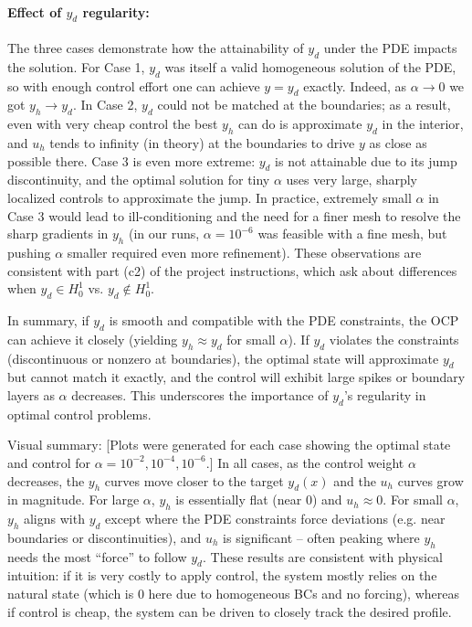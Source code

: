 \paragraph{Effect of $y_d$ regularity:} The three cases demonstrate how the attainability of $y_d$ under the PDE impacts the solution. For Case 1, $y_d$ was itself a valid homogeneous solution of the PDE, so with enough control effort one can achieve $y=y_d$ exactly. Indeed, as $\alpha\to 0$ we got $y_h\to y_d$. In Case 2, $y_d$ could not be matched at the boundaries; as a result, even with very cheap control the best $y_h$ can do is approximate $y_d$ in the interior, and $u_h$ tends to infinity (in theory) at the boundaries to drive $y$ as close as possible there. Case 3 is even more extreme: $y_d$ is not attainable due to its jump discontinuity, and the optimal solution for tiny $\alpha$ uses very large, sharply localized controls to approximate the jump. In practice, extremely small $\alpha$ in Case 3 would lead to ill-conditioning and the need for a finer mesh to resolve the sharp gradients in $y_h$ (in our runs, $\alpha=10^{-6}$ was feasible with a fine mesh, but pushing $\alpha$ smaller required even more refinement). These observations are consistent with part (c2) of the project instructions, which ask about differences when $y_d \in H^1_0$ vs. $y_d\notin H^1_0$.

In summary, if $y_d$ is smooth and compatible with the PDE constraints, the OCP can achieve it closely (yielding $y_h \approx y_d$ for small $\alpha$). If $y_d$ violates the constraints (discontinuous or nonzero at boundaries), the optimal state will approximate $y_d$ but cannot match it exactly, and the control will exhibit large spikes or boundary layers as $\alpha$ decreases. This underscores the importance of $y_d$'s regularity in optimal control problems.

Visual summary: [Plots were generated for each case showing the optimal state and control for $\alpha=10^{-2}, 10^{-4}, 10^{-6}$.] In all cases, as the control weight $\alpha$ decreases, the $y_h$ curves move closer to the target $y_d(x)$ and the $u_h$ curves grow in magnitude. For large $\alpha$, $y_h$ is essentially flat (near 0) and $u_h\approx 0$. For small $\alpha$, $y_h$ aligns with $y_d$ except where the PDE constraints force deviations (e.g. near boundaries or discontinuities), and $u_h$ is significant -- often peaking where $y_h$ needs the most ``force'' to follow $y_d$. These results are consistent with physical intuition: if it is very costly to apply control, the system mostly relies on the natural state (which is 0 here due to homogeneous BCs and no forcing), whereas if control is cheap, the system can be driven to closely track the desired profile.

